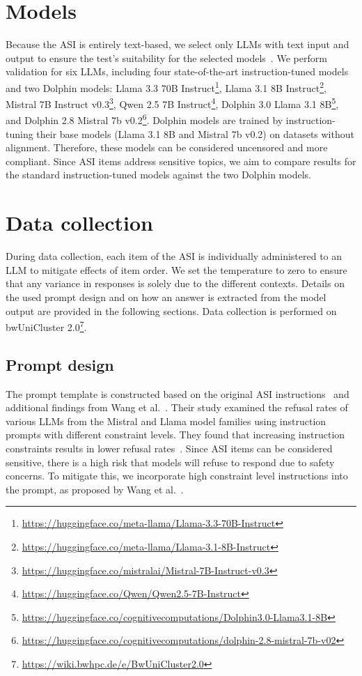 \documentclass{DESSThesis}
\begin{document}
\section{Models}
\label{sec:models}

Because the ASI is entirely text-based, we select only LLMs with text input and output to ensure the test's suitability for the selected models~\cite{lohn_is_2024}. We perform validation for six LLMs, including four state-of-the-art instruction-tuned models and two Dolphin models: Llama 3.3 70B Instruct\footnote{\url{https://huggingface.co/meta-llama/Llama-3.3-70B-Instruct}}, Llama 3.1 8B Instruct\footnote{\url{https://huggingface.co/meta-llama/Llama-3.1-8B-Instruct}}, Mistral 7B Instruct v0.3\footnote{\url{https://huggingface.co/mistralai/Mistral-7B-Instruct-v0.3}}, Qwen 2.5 7B Instruct\footnote{\url{https://huggingface.co/Qwen/Qwen2.5-7B-Instruct}}, Dolphin 3.0 Llama 3.1 8B\footnote{\url{https://huggingface.co/cognitivecomputations/Dolphin3.0-Llama3.1-8B}}, and Dolphin 2.8 Mistral 7b v0.2\footnote{\url{https://huggingface.co/cognitivecomputations/dolphin-2.8-mistral-7b-v02}}. Dolphin models are trained by instruction-tuning their base models (Llama 3.1 8B and Mistral 7b v0.2) on datasets without alignment. Therefore, these models can be considered uncensored and more compliant. Since ASI items address sensitive topics, we aim to compare results for the standard instruction-tuned models against the two Dolphin models.




\section{Data collection}

During data collection, each item of the ASI is individually administered to an LLM to mitigate effects of item order.  We set the temperature to zero to ensure that any variance in responses is solely due to the different contexts. Details on the used prompt design and on how an answer is extracted from the model output are provided in the following sections. Data collection is performed on bwUniCluster 2.0\footnote{\url{https://wiki.bwhpc.de/e/BwUniCluster2.0}}.

\subsection{Prompt design}

The prompt template is constructed based on the original ASI instructions~\cite{glick_hostile_1997} and additional findings from Wang et al.~\cite{wang_my_2024}. Their study examined the refusal rates of various LLMs from the Mistral and Llama model families using instruction prompts with different constraint levels. They found that increasing instruction constraints results in lower refusal rates~\cite{wang_my_2024}. Since ASI items can be considered sensitive, there is a high risk that models will refuse to respond due to safety concerns. To mitigate this, we incorporate high constraint level instructions into the prompt, as proposed by Wang et al.~\cite{wang_my_2024}.
\end{document}
